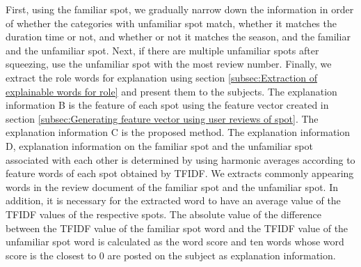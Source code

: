 \documentclass[journal]{IAENGtran}
\begin{document}
First, using the familiar spot, we gradually narrow down the information in order of whether the categories with unfamiliar spot match, whether it matches the duration time or not, and whether or not it matches the season, and the familiar and the unfamiliar spot.
Next, if there are multiple unfamiliar spots after squeezing, use the unfamiliar spot with the most review number.
Finally, we extract the role words for explanation using section \ref{subsec:Extraction of explainable words for role} and present them to the subjects.
The explanation information B is the feature of each spot using the feature vector created in section \ref{subsec:Generating feature vector using user reviews of spot}.
The explanation information C is the proposed method.
The explanation information D, explanation information on the familiar spot and the unfamiliar spot associated with each other is determined by using harmonic averages according to feature words of each spot obtained by TFIDF.
We extracts commonly appearing words in the review document of the familiar spot and the unfamiliar spot.
In addition, it is necessary for the extracted word to have an average value of the TFIDF values ​​of the respective spots.
The absolute value of the difference between the TFIDF value of the familiar spot word and the TFIDF value of the unfamiliar spot word is calculated as the word score and ten words whose word score is the closest to 0 are posted on the subject as explanation information.
\end{document}
